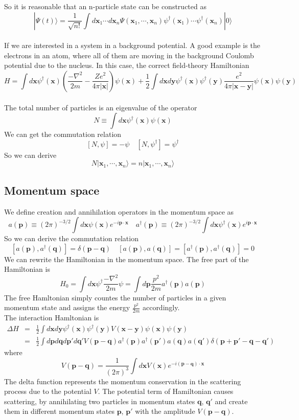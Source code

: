 So it is reasonable that  an n-particle state can be constructed as
\[|\Psi(t)\rangle = \frac{1}{\sqrt{n!}} \int d\bm{x}_1 \cdots d\bm{x}_n \Psi(\bm{x}_1,\cdots,\bm{x}_n) \psi^{\dagger}(\bm{x}_1)\cdots\psi^{\dagger}(\bm{x}_n)|0\rangle\]
\\
If we are interested in a system in a background potential.  
A good example is the electrons in an atom, where all of them are moving in the background Coulomb potential due to the nucleus. In this case, the correct field-theory Hamiltonian
\[H = \int d\bm{x} \psi^{\dagger}(\bm{x}) \left(\frac{-\nabla^2}{2m} - \frac{Ze^2}{4\pi |\bm{x}|} \right)\psi(\bm{x}) + \frac{1}{2}\int d\bm{x} d\bm{y} \psi^{\dagger}(\bm{x}) \psi^{\dagger}(\bm{y}) \frac{e^2}{4\pi|\bm{x}-\bm{y}|} \psi(\bm{x})\psi(\bm{y})\]
\\
The total number of particles is an eigenvalue of the operator
\[N \equiv \int d\bm{x} \psi^{\dagger}(\bm{x})\psi(\bm{x})\]
We can get the commutation relation
\[[N,\psi] = -\psi \quad [N,\psi^{\dagger}] = \psi^{\dagger}\]
So we can derive
\[N|\bm{x}_1,\cdots,\bm{x}_n\rangle = n|\bm{x}_1,\cdots,\bm{x}_n\rangle\]

\subsection{Momentum space}
We define creation and annihilation operators in the
momentum space as
\[a(\bm{p}) \equiv (2\pi)^{-3/2}\int d\bm{x} \psi(\bm{x}) e^{-i\bm{p}\cdot\bm{x}} \quad a^{\dagger}(\bm{p}) \equiv  (2\pi)^{-3/2} \int d\bm{x} \psi^{\dagger}(\bm{x}) e^{i\bm{p}\cdot\bm{x}}\]
So we can derive the commutation relation
\[[a(\bm{p}),a^{\dagger}(\bm{q})] = \delta(\bm{p}-\bm{q}) \quad [a(\bm{p}),a(\bm{q})] = [a^{\dagger}(\bm{p}),a^{\dagger}(\bm{q})] = 0\]
We can rewrite the Hamiltonian in the momentum space. The
free part of the Hamiltonian is
\[H_0 = \int d\bm{x} \psi^{\dagger} \frac{-\nabla^2}{2m} \psi = \int d\bm{p} \frac{p^2}{2m} a^{\dagger}(\bm{p})a(\bm{p})\]
The free Hamltonian simply countes the number of particles in a given momentum state and assigns the energy $\frac{p^2}{2m}$ accordingly. \\
The interaction Hamltonian is
\begin{eqnarray}
\Delta H &=& \frac{1}{2}\int d\bm{x} d\bm{y} \psi^{\dagger}(\bm{x}) \psi^{\dagger}(\bm{y}) V(\bm{x} - \bm{y}) \psi(\bm{x})\psi(\bm{y})  \nonumber \\
&=& \frac{1}{2} \int d\bm{p}d\bm{q}d\bm{p}'d\bm{q}' V(\bm{p}-\bm{q}) a^{\dagger}(\bm{p}) a^{\dagger}(\bm{p}') a(\bm{q}) a(\bm{q}') \delta(\bm{p}+\bm{p}'-\bm{q}-\bm{q}')\nonumber
\end{eqnarray}
where
\[V(\bm{p}-\bm{q}) = \frac{1}{(2\pi)^3} \int d\bm{x} V(\bm{x}) e^{-i(\bm{p}-\bm{q})\cdot\bm{x}}\]
The delta function represents the momentum conservation in the scattering process due to the potential $V$. The potential term of Hamiltonian causes scattering, by annihilating two particles in momentum states $\bm{q}$, $\bm{q}'$ and create them in different momentum states $\bm{p}$, $\bm{p}'$ with the amplitude
$V(\bm{p}-\bm{q})$.


